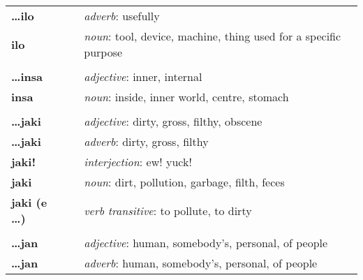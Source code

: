 \begin{supertabular}{p{2,5cm}|ll}
    \textbf{\dots ilo}           &  & \textit{adverb}: usefully                                                                                  \\
    \textbf{ilo}                 &  & \textit{noun}: tool, device, machine, thing used for a specific purpose                                    \\
                                 &  &                                                                                                            \\
    \textbf{\dots insa}          &  & \textit{adjective}: inner, internal                                                                        \\
    \textbf{insa}                &  & \textit{noun}: inside, inner world, centre, stomach                                                        \\
                                 &  &                                                                                                            \\
    \textbf{\dots jaki}          &  & \textit{adjective}: dirty, gross, filthy, obscene                                                          \\
    \textbf{\dots jaki}          &  & \textit{adverb}: dirty, gross, filthy                                                                      \\
    \textbf{jaki!}               &  & \textit{interjection}: ew! yuck!                                                                           \\
    \textbf{jaki}                &  & \textit{noun}: dirt, pollution, garbage, filth, feces                                                      \\
    \textbf{jaki (e \dots)}      &  & \textit{verb transitive}: to pollute, to dirty                                                             \\
                                 &  &                                                                                                            \\
    \textbf{\dots jan}           &  & \textit{adjective}: human, somebody's, personal, of people                                                 \\
    \textbf{\dots jan}           &  & \textit{adverb}: human, somebody's, personal, of people                                                    \\

\end{supertabular}
